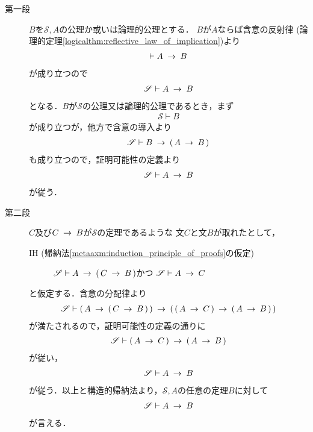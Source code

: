 	\begin{metaprf}\mbox{}
		\begin{description}
			\item[第一段]
				$B$を$\mathscr{S},A$の公理か或いは論理的公理とする．
				$B$が$A$ならば含意の反射律
				(論理的定理\ref{logicalthm:reflective_law_of_implication})より
				\begin{align}
					\vdash A \hspace{0.25em}\rightarrow\hspace{0.25em} B
				\end{align}
				が成り立つので
				\begin{align}
					\mathscr{S} \vdash A \hspace{0.25em}\rightarrow\hspace{0.25em} B
				\end{align}
				となる．$B$が$\mathscr{S}$の公理又は論理的公理であるとき，まず
				\begin{align}
					\mathscr{S} \vdash B
				\end{align}
				が成り立つが，他方で含意の導入より
				\begin{align}
					\mathscr{S} \vdash B \hspace{0.25em}\rightarrow\hspace{0.25em} (\, A \hspace{0.25em}\rightarrow\hspace{0.25em} B\, ) 
				\end{align}
				も成り立つので，証明可能性の定義より
				\begin{align}
					\mathscr{S} \vdash A \hspace{0.25em}\rightarrow\hspace{0.25em} B
				\end{align}
				が従う．
				
			\item[第二段]
				$C$及び$C \hspace{0.25em}\rightarrow\hspace{0.25em} B$が$\mathscr{S}$の定理であるような
				文$C$と文$B$が取れたとして，
				\begin{description}
					\item[IH (帰納法\ref{metaaxm:induction_principle_of_proofs}の仮定)]
						$\mathscr{S} \vdash A \hspace{0.25em}\rightarrow\hspace{0.25em} (\, C \hspace{0.25em}\rightarrow\hspace{0.25em} B\, )$かつ
						$\mathscr{S} \vdash A \hspace{0.25em}\rightarrow\hspace{0.25em} C$
				\end{description}
				と仮定する．含意の分配律より
				\begin{align}
					\mathscr{S} \vdash 
					(\, A \hspace{0.25em}\rightarrow\hspace{0.25em} (\, C \hspace{0.25em}\rightarrow\hspace{0.25em} B\, )\, ) 
					\hspace{0.25em}\rightarrow\hspace{0.25em} (\, (\, A \hspace{0.25em}\rightarrow\hspace{0.25em} C\, ) \hspace{0.25em}\rightarrow\hspace{0.25em} (\, A \hspace{0.25em}\rightarrow\hspace{0.25em} B\, )\, )
				\end{align}
				が満たされるので，証明可能性の定義の通りに
				\begin{align}
					\mathscr{S} \vdash (\, A \hspace{0.25em}\rightarrow\hspace{0.25em} C\, ) 
					\hspace{0.25em}\rightarrow\hspace{0.25em} (\, A \hspace{0.25em}\rightarrow\hspace{0.25em} B\, )
				\end{align}
				が従い，
				\begin{align}
					\mathscr{S} \vdash A \hspace{0.25em}\rightarrow\hspace{0.25em} B
				\end{align}
				が従う．以上と構造的帰納法より，$\mathscr{S},A$の任意の定理$B$に対して
				\begin{align}
					\mathscr{S} \vdash A \hspace{0.25em}\rightarrow\hspace{0.25em} B
				\end{align}
				が言える．
				\QED
		\end{description}
	\end{metaprf}
	
